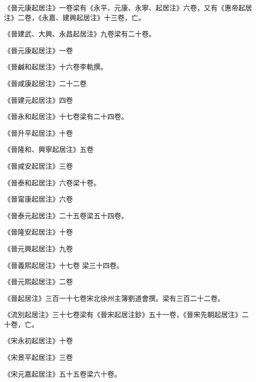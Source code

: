 \begin{pinyinscope}
 《晉元康起居注》一卷梁有《永平、元康、永寧、起居注》六卷，又有《惠帝起居注》二卷，《永嘉、建興起居注》十三卷，亡。



 《晉建武、大興、永昌起居注》九卷梁有二十卷。



 《晉元康起居注》一卷



 《晉鹹和起居注》十六卷李軌撰。



 《晉咸康起居注》二十二卷



 《晉建元起居注》四卷



 《晉永和起居注》十七卷梁有二十四卷。



 《晉升平起居注》十卷



 《晉隆和、興寧起居注》五卷



 《晉咸安起居注》三卷



 《晉泰和起居注》六卷梁十卷。



 《晉甯康起居注》六卷



 《晉泰元起居注》二十五卷梁五十四卷。



 《晉隆安起居注》十卷



 《晉元興起居注》九卷



 《晉義熙起居注》十七卷
 梁三十四卷。



 《晉元熙起居注》二卷



 《晉起居注》三百一十七卷宋北徐州主簿劉道會撰。梁有三百二十二卷。



 《流別起居注》三十七卷梁有《晉宋起居注鈔》五十一卷，《晉宋先朝起居注》二十卷，亡。



 《宋永初起居注》十卷



 《宋景平起居注》三卷



 《宋元嘉起居注》五十五卷梁六十卷。




\end{pinyinscope}
